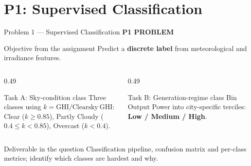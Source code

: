 \documentclass[aspectratio=169,11pt]{beamer}
\newcommand{\sectiontag}[1]{{\footnotesize\usebeamercolor[fg]{structure}\textbf{#1}}\par\vspace{0.10cm}}
\begin{document}
\section{P1: Supervised Classification}

\begin{frame}{Problem 1 — Supervised Classification}
\sectiontag{P1 \quad PROBLEM}
\begin{block}{Objective from the assignment}
Predict a \textbf{discrete label} from meteorological and irradiance features.
\end{block}
\vspace{0.02cm}
\begin{columns}[T,totalwidth=\textwidth]
\begin{column}{0.49\textwidth}
\begin{block}{Task A: Sky-condition class}
\small Three classes using $k=\mathrm{GHI}/\mathrm{Clearsky\ GHI}$:\\[2pt]
Clear ($k\ge0.85$), Partly Cloudy ($0.4\le k<0.85$), Overcast ($k<0.4$).
\end{block}
\end{column}
\begin{column}{0.49\textwidth}
\begin{block}{Task B: Generation-regime class}
\small Bin Output Power into city-specific terciles:\\[3pt]
\textbf{Low / Medium / High}.
\end{block}
\end{column}
\end{columns}
\vspace{0.10cm}
\begin{block}{Deliverable in the question}
\small Classification pipeline, confusion matrix and per-class metrics; identify which classes are hardest and why.
\end{block}
\end{frame}
\end{document}
